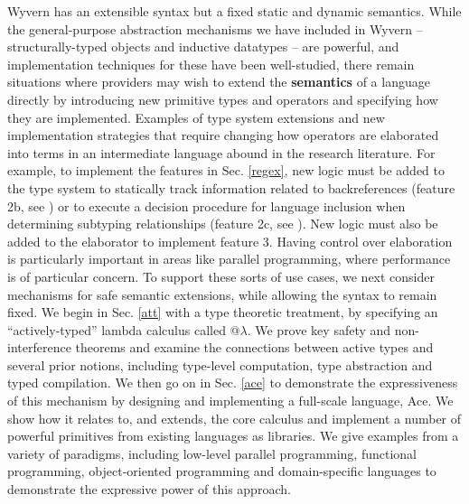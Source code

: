 Wyvern has an extensible syntax but a fixed static and dynamic semantics. While the general-purpose abstraction mechanisms we have included in Wyvern -- structurally-typed objects and inductive datatypes -- are powerful, and implementation techniques for these have been well-studied, there remain situations where providers may wish to extend the \textbf{semantics} of a language directly by introducing new primitive types and operators and specifying how they are implemented. Examples of type system extensions and new implementation strategies that require changing how operators are elaborated into terms in an intermediate language abound in the research literature. For example, to implement the features in Sec. \ref{regex}, new logic must be added to the type system to statically track information related to backreferences (feature 2b, see \cite{spishak2012type}) or to execute a decision procedure for language inclusion when determining subtyping relationships (feature 2c, see \cite{fulton-thesis}). New logic must also be added to the elaborator to implement feature 3. Having control over elaboration is particularly important in areas like parallel programming, where performance is of particular concern. To support these sorts of use cases, we next consider mechanisms for safe semantic extensions, while allowing the syntax to remain fixed. We begin in Sec. \ref{att} with a type theoretic treatment, by specifying an ``actively-typed'' lambda calculus called @$\lambda$. We prove key safety and non-interference theorems and examine the connections between active types and several prior notions, including type-level computation, type abstraction and typed compilation. We then go on in Sec. \ref{ace} to demonstrate the expressiveness of this mechanism by designing and implementing a full-scale language, Ace. We show how it relates to, and extends, the core calculus and implement a number of powerful primitives from existing languages as libraries. We give examples from a variety of paradigms, including low-level parallel programming, functional programming,  object-oriented programming and domain-specific languages to demonstrate the expressive power of this approach.

